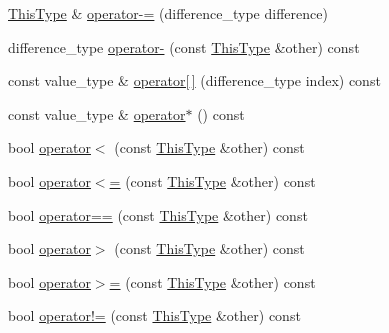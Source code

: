 \begin{DoxyCompactItemize}
\item 
\hyperlink{classvct_var_stride_matrix_const_iterator_af68182ea2024c532e999fd1333cb0c6e}{This\-Type} \& \hyperlink{classvct_var_stride_matrix_const_iterator_a45a5ebcc3983c0ce8265fb3eafb34621}{operator-\/=} (difference\-\_\-type difference)
\item 
difference\-\_\-type \hyperlink{classvct_var_stride_matrix_const_iterator_ae83074b51d8762c9614dd4fad3e133dc}{operator-\/} (const \hyperlink{classvct_var_stride_matrix_const_iterator_af68182ea2024c532e999fd1333cb0c6e}{This\-Type} \&other) const 
\item 
const value\-\_\-type \& \hyperlink{classvct_var_stride_matrix_const_iterator_ab782fc7bfc50b0575c01d8b77a293a84}{operator\mbox{[}$\,$\mbox{]}} (difference\-\_\-type index) const 
\item 
const value\-\_\-type \& \hyperlink{classvct_var_stride_matrix_const_iterator_a4628c053774ba753b8ceefb9305d62c8}{operator$\ast$} () const 
\item 
bool \hyperlink{classvct_var_stride_matrix_const_iterator_a8c038c000c5b8dc223358d2843054bb8}{operator$<$} (const \hyperlink{classvct_var_stride_matrix_const_iterator_af68182ea2024c532e999fd1333cb0c6e}{This\-Type} \&other) const 
\item 
bool \hyperlink{classvct_var_stride_matrix_const_iterator_a837e4aa15808810dae684b1d4789d63e}{operator$<$=} (const \hyperlink{classvct_var_stride_matrix_const_iterator_af68182ea2024c532e999fd1333cb0c6e}{This\-Type} \&other) const 
\item 
bool \hyperlink{classvct_var_stride_matrix_const_iterator_abe326522f82faad45384355857ddbb46}{operator==} (const \hyperlink{classvct_var_stride_matrix_const_iterator_af68182ea2024c532e999fd1333cb0c6e}{This\-Type} \&other) const 
\item 
bool \hyperlink{classvct_var_stride_matrix_const_iterator_a3615a778a236ec59b62d803ffb3e124f}{operator$>$} (const \hyperlink{classvct_var_stride_matrix_const_iterator_af68182ea2024c532e999fd1333cb0c6e}{This\-Type} \&other) const 
\item 
bool \hyperlink{classvct_var_stride_matrix_const_iterator_a5aa768c3753dd6121ae4b127d6e42281}{operator$>$=} (const \hyperlink{classvct_var_stride_matrix_const_iterator_af68182ea2024c532e999fd1333cb0c6e}{This\-Type} \&other) const 
\item 
bool \hyperlink{classvct_var_stride_matrix_const_iterator_a8cdf3c2ad9c67fca98a66a5b31ecf38c}{operator!=} (const \hyperlink{classvct_var_stride_matrix_const_iterator_af68182ea2024c532e999fd1333cb0c6e}{This\-Type} \&other) const 
\end{DoxyCompactItemize}
